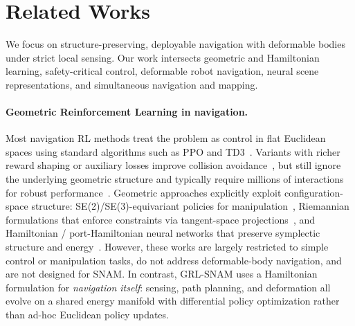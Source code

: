 \section{Related Works}

We focus on structure-preserving, deployable navigation with deformable bodies under strict local sensing. Our work intersects geometric and Hamiltonian learning, safety-critical control, deformable robot navigation, neural scene representations, and simultaneous navigation and mapping.

\paragraph{Geometric Reinforcement Learning in navigation.}
Most navigation RL methods treat the problem as control in flat Euclidean spaces using standard algorithms such as PPO and TD3~\citep{schulman2017ppo,fujimoto2018td3}. Variants with richer reward shaping or auxiliary losses improve collision avoidance~\citep{taheri2024enhanced}, but still ignore the underlying geometric structure and typically require millions of interactions for robust performance~\citep{dehghani2024survey}. Geometric approaches explicitly exploit configuration-space structure: SE(2)/SE(3)-equivariant policies for manipulation~\citep{hoang2025geometry}, Riemannian formulations that enforce constraints via tangent-space projections~\citep{martinez2023accelerated, riemannian2023safe}, and Hamiltonian / port-Hamiltonian neural networks that preserve symplectic structure and energy~\citep{aps2021port}. However, these works are largely restricted to simple control or manipulation tasks, do not address deformable-body navigation, and are not designed for SNAM. In contrast, GRL-SNAM uses a Hamiltonian formulation for \emph{navigation itself}: sensing, path planning, and deformation all evolve on a shared energy manifold with differential policy optimization rather than ad-hoc Euclidean policy updates. 


